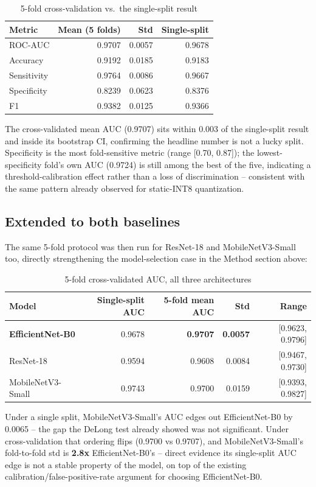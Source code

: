 \documentclass[11pt]{article}
\begin{document}
\begin{table}[h]
\centering
\caption{5-fold cross-validation vs.\ the single-split result}
\begin{tabular}{lrrr}
\toprule
Metric & Mean (5 folds) & Std & Single-split \\
\midrule
ROC-AUC & 0.9707 & 0.0057 & 0.9678 \\
Accuracy & 0.9192 & 0.0185 & 0.9183 \\
Sensitivity & 0.9764 & 0.0086 & 0.9667 \\
Specificity & 0.8239 & 0.0623 & 0.8376 \\
F1 & 0.9382 & 0.0125 & 0.9366 \\
\bottomrule
\end{tabular}
\end{table}

\noindent The cross-validated mean AUC (0.9707) sits within 0.003 of the
single-split result and inside its bootstrap CI, confirming the headline
number is not a lucky split. Specificity is the most fold-sensitive metric
(range [0.70, 0.87]); the lowest-specificity fold's own AUC (0.9724) is
still among the best of the five, indicating a threshold-calibration effect
rather than a loss of discrimination -- consistent with the same pattern
already observed for static-INT8 quantization.

\subsection*{Extended to both baselines}
The same 5-fold protocol was then run for ResNet-18 and MobileNetV3-Small too,
directly strengthening the model-selection case in the Method section above:

\begin{table}[h]
\centering
\caption{5-fold cross-validated AUC, all three architectures}
\begin{tabular}{lrrrr}
\toprule
Model & Single-split AUC & 5-fold mean AUC & Std & Range \\
\midrule
\textbf{EfficientNet-B0} & 0.9678 & \textbf{0.9707} & \textbf{0.0057} & [0.9623, 0.9796] \\
ResNet-18 & 0.9594 & 0.9608 & 0.0084 & [0.9467, 0.9730] \\
MobileNetV3-Small & 0.9743 & 0.9700 & 0.0159 & [0.9393, 0.9827] \\
\bottomrule
\end{tabular}
\end{table}

\noindent Under a single split, MobileNetV3-Small's AUC edges out
EfficientNet-B0 by 0.0065 -- the gap the DeLong test already showed was not
significant. Under cross-validation that ordering flips (0.9700 vs 0.9707),
and MobileNetV3-Small's fold-to-fold std is \textbf{2.8x} EfficientNet-B0's
-- direct evidence its single-split AUC edge is not a stable property of
the model, on top of the existing calibration/false-positive-rate argument
for choosing EfficientNet-B0.
\end{document}
